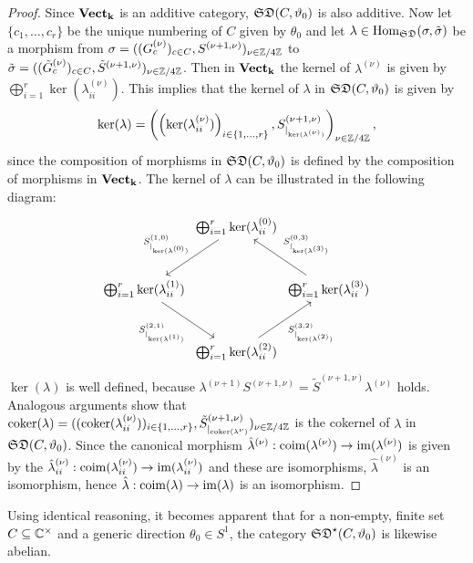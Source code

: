 \begin{proof} Since $\mathbf{Vect}_{\mathbf{k}}$ is an additive category, $\mathfrak{SD}(C,\vartheta_0)$ is also additive.
      Now let $\{c_1, \dots, c_r\}$ be the unique numbering of $C$ given by $\theta_0$ and let $\lambda \in \operatorname{Hom}_{\mathfrak{SD}}(\sigma, \tilde{\sigma})$ be a morphism from $\sigma = ((G_c^{(\nu)})_{c \in C}, S^{(\nu+1, \nu)})_{\nu \in \mathbb{Z}/4\mathbb{Z}}$ to $\tilde{\sigma}=((\tilde{G}_c^{(\nu)})_{c \in C}, \tilde{S}^{(\nu+1, \nu)})_{\nu \in \mathbb{Z}/4\mathbb{Z}}$. Then in $\mathbf{Vect}_{\mathbf{k}}$ the kernel of $\lambda^{(\nu)}$ is given by $\bigoplus_{i = 1}^r \ker(\lambda_{ii}^{(\nu)})$. This implies that the kernel of $\lambda$ in $\mathfrak{SD}(C,\vartheta_0)$ is given by \[\ker(\lambda) = \left(\left(\ker(\lambda_{ii}^{(\nu)})\right)_{i \in \{1, \dots,r\}}, S^{(\nu+1, \nu)}_{\vert_{\ker(\lambda^{(\nu)})}}\right)_{\nu \in \mathbb{Z}/4\mathbb{Z}},\] since the composition of morphisms in $\mathfrak{SD}(C,\vartheta_0)$ is defined by the composition of morphisms in $\mathbf{Vect}_{\mathbf{k}}$. The kernel of $\lambda$ can be illustrated in the following diagram: 
      \[
         \begin{tikzcd}[row sep=1cm, column sep=0cm]
         & \bigoplus_{i = 1}^r \ker(\lambda^{(0)}_{ii}) \arrow[dl, "S^{(1,0)}_{\vert_{\ker(\lambda^{(0)})}}"'] & \\
        \bigoplus_{i = 1}^r \ker(\lambda^{(1)}_{ii}) \arrow[dr, "S^{(2,1)}_{\vert_{\ker(\lambda^{(1)})}}"'] & & \bigoplus_{i = 1}^r \ker(\lambda^{(3)}_{ii}) \arrow[ul, "S^{(0,3)}_{\vert_{\ker(\lambda^{(3)})}}" above right] \\
        & \bigoplus_{i = 1}^r \ker(\lambda^{(2)}_{ii})\arrow[ur, "S^{(3,2)}_{\vert_{\ker(\lambda^{(2)})}}" below right] &
        \end{tikzcd}
        \]
      $\ker(\lambda)$ is well defined, because $ \lambda^{(\nu+1)}S^{(\nu+1, \nu)} = \tilde{S}^{(\nu+1,\nu)}\lambda^{(\nu)}$ holds. Analogous arguments show that $\operatorname{coker}(\lambda) = ((\operatorname{coker}(\lambda_{ii}^{(\nu)}))_{i\in \{1, \dots, r\}}, \tilde{S}^{(\nu+1,\nu)}_{\vert_{\operatorname{coker}(\lambda^{\nu})}})_{\nu \in \mathbb{Z}/4\mathbb{Z}}$ is the cokernel of $\lambda$ in $\mathfrak{SD}(C,\vartheta_0)$. 
      Since the canonical morphism $\hat{\lambda}^{(\nu)}:\operatorname{coim}(\lambda^{(\nu)}) \to \operatorname{im}(\lambda^{(\nu)})$ is given by the $\hat{\lambda}^{(\nu)}_{ii}:\operatorname{coim}(\lambda^{(\nu)}_{ii}) \to \operatorname{im}(\lambda^{(\nu)}_{ii})$ and these are isomorphisms, $\hat{\lambda}^{(\nu)}$ is an isomorphism, hence $\hat{\lambda}:\operatorname{coim}(\lambda) \to \operatorname{im}(\lambda)$ is an isomorphism.
\end{proof}

\begin{rem}
    Using identical reasoning, it becomes apparent that for a non-empty, finite set $C \subseteq \mathbb{C}^\times$ and a generic direction $\theta_0 \in S^1$, the category $\mathfrak{SD}^\star(C,\vartheta_0)$ is likewise abelian.
\end{rem}

